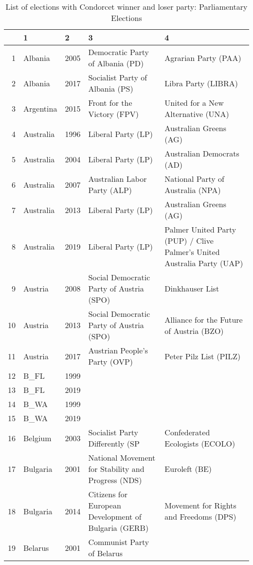 \documentclass[12pt]{article}
\begin{document}
\begin{table}[ht]
\centering
\caption{List of elections with Condorcet winner and loser party: Parliamentary Elections}
\begin{footnotesize}
\begin{tabular}{rllll}
  \hline
 & 1 & 2 & 3 & 4 \\ 
  \hline
1 & Albania & 2005 &   Democratic Party of Albania (PD) &   Agrarian Party (PAA) \\ 
  2 & Albania & 2017 &   Socialist Party of Albania (PS) &   Libra Party (LIBRA) \\ 
  3 & Argentina & 2015 &   Front for the Victory (FPV) &   United for a New Alternative (UNA)  \\ 
  4 & Australia & 1996 &   Liberal Party (LP) &   Australian Greens (AG) \\ 
  5 & Australia & 2004 &   Liberal Party (LP) &   Australian Democrats (AD) \\ 
  6 & Australia & 2007 &   Australian Labor Party (ALP) &   National Party of Australia (NPA)   \\ 
  7 & Australia & 2013 &   Liberal Party (LP) &   Australian Greens (AG) \\ 
  8 & Australia & 2019 &   Liberal Party (LP) &   Palmer United Party (PUP) / Clive Palmer's United Australia Party (UAP) \\ 
  9 & Austria & 2008 &   Social Democratic Party of Austria (SPO) &   Dinkhauser List  \\ 
  10 & Austria & 2013 &   Social Democratic Party of Austria (SPO) &   Alliance for the Future of Austria (BZO) \\ 
  11 & Austria & 2017 &   Austrian People's Party (OVP) &   Peter Pilz List (PILZ) \\ 
  12 & B\_FL & 1999 &  &  \\ 
  13 & B\_FL & 2019 &  &  \\ 
  14 & B\_WA & 1999 &  &  \\ 
  15 & B\_WA & 2019 &  &  \\ 
  16 & Belgium & 2003 &   Socialist Party Differently (SP &   Confederated Ecologists (ECOLO) \\ 
  17 & Bulgaria & 2001 &   National Movement for Stability and Progress (NDS) &   Euroleft (BE) \\ 
  18 & Bulgaria & 2014 &   Citizens for European Development of Bulgaria (GERB) &   Movement for Rights and Freedoms (DPS) \\ 
  19 & Belarus & 2001 &   Communist Party of Belarus  &  \\ 

\end{tabular}
\end{footnotesize}
\end{table}
\end{document}
